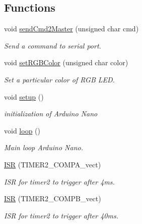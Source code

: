 \subsection*{Functions}
\begin{DoxyCompactItemize}
\item 
void \mbox{\hyperlink{slave_8ino_afaecaf2f7ff3d385786f146797fe3970}{send\+Cmd2\+Master}} (unsigned char cmd)
\begin{DoxyCompactList}\small\item\em Send a command to serial port. \end{DoxyCompactList}\item 
void \mbox{\hyperlink{slave_8ino_a1838aedbd7c80d2e66f6edf920484f72}{set\+R\+G\+B\+Color}} (unsigned char color)
\begin{DoxyCompactList}\small\item\em Set a particular color of R\+GB L\+ED. \end{DoxyCompactList}\item 
void \mbox{\hyperlink{slave_8ino_a4fc01d736fe50cf5b977f755b675f11d}{setup}} ()
\begin{DoxyCompactList}\small\item\em initialization of Arduino Nano \end{DoxyCompactList}\item 
void \mbox{\hyperlink{slave_8ino_afe461d27b9c48d5921c00d521181f12f}{loop}} ()
\begin{DoxyCompactList}\small\item\em Main loop Arduino Nano. \end{DoxyCompactList}\item 
\mbox{\hyperlink{slave_8ino_a5686c229bdef50123688ab6cb1404230}{I\+SR}} (T\+I\+M\+E\+R2\+\_\+\+C\+O\+M\+P\+A\+\_\+vect)
\begin{DoxyCompactList}\small\item\em I\+SR for timer2 to trigger after 4ms. \end{DoxyCompactList}\item 
\mbox{\hyperlink{slave_8ino_aa282d056dc0e67857fc700fdce321f30}{I\+SR}} (T\+I\+M\+E\+R2\+\_\+\+C\+O\+M\+P\+B\+\_\+vect)
\begin{DoxyCompactList}\small\item\em I\+SR for timer2 to trigger after 40ms. \end{DoxyCompactList}\end{DoxyCompactItemize}
